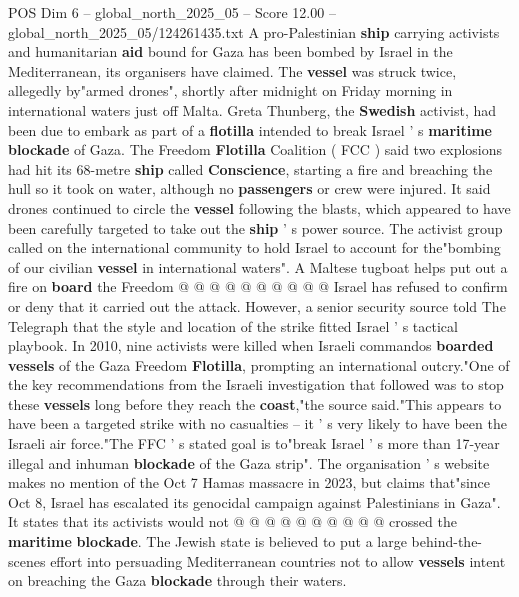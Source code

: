 \begin{textsample}{POS Dim 6 – global\_north\_2025\_05 – Score 12.00 – global\_north\_2025\_05/124261435.txt}  \label{ex:f6_pos_065}
A pro-Palestinian \textbf{ship} carrying activists and humanitarian \textbf{aid} bound for Gaza has been bombed by Israel in the Mediterranean, its organisers have claimed.
The \textbf{vessel} was struck twice, allegedly by"armed drones", shortly after midnight on Friday morning in international waters just off Malta.
Greta Thunberg, the \textbf{Swedish} activist, had been due to embark as part of a \textbf{flotilla} intended to break Israel ' s \textbf{maritime} \textbf{blockade} of Gaza.
The Freedom \textbf{Flotilla} Coalition ( FCC ) said two explosions had hit its 68-metre \textbf{ship} called \textbf{Conscience}, starting a fire and breaching the hull so it took on water, although no \textbf{passengers} or crew were injured.
It said drones continued to circle the \textbf{vessel} following the blasts, which appeared to have been carefully targeted to take out the \textbf{ship} ' s power source.
The activist group called on the international community to hold Israel to account for the"bombing of our civilian \textbf{vessel} in international waters".
A Maltese tugboat helps put out a fire on \textbf{board} the Freedom @ @ @ @ @ @ @ @ @ @ Israel has refused to confirm or deny that it carried out the attack.
However, a senior security source told The Telegraph that the style and location of the strike fitted Israel ' s tactical playbook.
In 2010, nine activists were killed when Israeli commandos \textbf{boarded} \textbf{vessels} of the Gaza Freedom \textbf{Flotilla}, prompting an international outcry."One of the key recommendations from the Israeli investigation that followed was to stop these \textbf{vessels} long before they reach the \textbf{coast},"the source said."This appears to have been a targeted strike with no casualties -- it ' s very likely to have been the Israeli air force."The FFC ' s stated goal is to"break Israel ' s more than 17-year illegal and inhuman \textbf{blockade} of the Gaza strip".
The organisation ' s website makes no mention of the Oct 7 Hamas massacre in 2023, but claims that"since Oct 8, Israel has escalated its genocidal campaign against Palestinians in Gaza".
It states that its activists would not @ @ @ @ @ @ @ @ @ @ crossed the \textbf{maritime} \textbf{blockade}.
The Jewish state is believed to put a large behind-the-scenes effort into persuading Mediterranean countries not to allow \textbf{vessels} intent on breaching the Gaza \textbf{blockade} through their waters.

\end{textsample}
